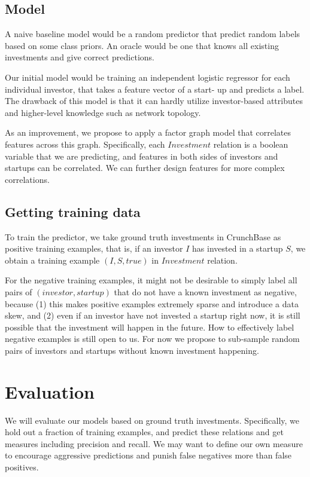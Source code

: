 \subsection{Model}\label{model}

A naive baseline model would be a random predictor that predict random
labels based on some class priors. An oracle would be one that knows all
existing investments and give correct predictions.

Our initial model would be training an independent logistic regressor
for each individual investor, that takes a feature vector of a start- up
and predicts a label. The drawback of this model is that it can hardly
utilize investor-based attributes and higher-level knowledge such as
network topology.

As an improvement, we propose to apply a factor graph model that
correlates features across this graph. Specifically, each \(Investment\)
relation is a boolean variable that we are predicting, and features in
both sides of investors and startups can be correlated. We can further
design features for more complex correlations.

\subsection{Getting training data}\label{getting-training-data}

To train the predictor, we take ground truth investments in CrunchBase
as positive training examples, that is, if an investor \(I\) has
invested in a startup \(S\), we obtain a training example
\((I, S, true)\) in \(Investment\) relation.

For the negative training examples, it might not be desirable to simply
label all pairs of \((investor, startup)\) that do not have a known
investment as negative, because (1) this makes positive examples
extremely sparse and introduce a data skew, and (2) even if an investor
have not invested a startup right now, it is still possible that the
investment will happen in the future. How to effectively label negative
examples is still open to us. For now we propose to sub-sample random
pairs of investors and startups without known investment happening.

\section{Evaluation}\label{evaluation}

We will evaluate our models based on ground truth investments.
Specifically, we hold out a fraction of training examples, and predict
these relations and get measures including precision and recall. We may
want to define our own measure to encourage aggressive predictions and
punish false negatives more than false positives.

